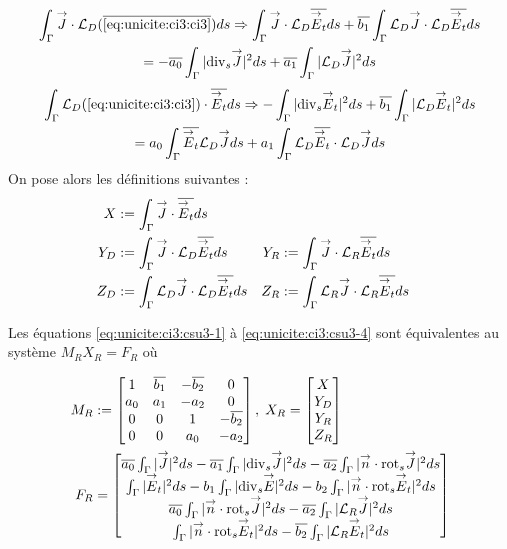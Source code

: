     \begin{multline}
    \label{eq:unicite:ci3:csu3-5}
    \int_\Gamma \vJ \cdot \LD ( \conj{\eqref{eq:unicite:ci3:ci3}} ) ds \Rightarrow
    \int_\Gamma \vJ \cdot \LD \conj{\vE_t} ds  + \conj{b_1} \int_\Gamma \LD \vJ \cdot \LD \conj{\vE_t} ds \\
    = - \conj{a_0} \int_\Gamma |\tdivs \vJ|^2ds + \conj{a_1} \int_\Gamma | \LD \vJ|^2 ds
  \end{multline}
  \begin{multline}
    \label{eq:unicite:ci3:csu3-6}
    \int_\Gamma  \LD ( \eqref{eq:unicite:ci3:ci3} ) \cdot \conj{\vE_t} ds \Rightarrow
    -\int_\Gamma | \tdivs \vE_t |^2 ds  + \conj{b_1} \int_\Gamma | \LD \vE_t|^2 ds \\
    = a_0 \int_\Gamma \conj{\vE_t} \LD \vJ ds + a_1 \int_\Gamma \LD \conj{\vE_t} \cdot \LD \vJ ds
  \end{multline}
  On pose alors les définitions suivantes :
  \begin{align*}
    X&:= \int_\Gamma {\overset{\rightarrow}{J}} \cdot {\overline{{\overset{\rightarrow}{E}}_t}} ds\\
    Y_D&:= \int_\Gamma {\overset{\rightarrow}{J}} \cdot {\mathcal{L}_D} {\overline{{\overset{\rightarrow}{E}}_t}} ds
    &Y_R&:= \int_\Gamma {\overset{\rightarrow}{J}} \cdot {\mathcal{L}_R} {\overline{{\overset{\rightarrow}{E}}_t}} ds\\
    Z_D&:= \int_\Gamma {\mathcal{L}_D} {\overset{\rightarrow}{J}} \cdot {\mathcal{L}_D} {\overline{{\overset{\rightarrow}{E}}_t}} ds
    &Z_R&:= \int_\Gamma {\mathcal{L}_R} {\overset{\rightarrow}{J}} \cdot {\mathcal{L}_R} {\overline{{\overset{\rightarrow}{E}}_t}} ds
  \end{align*}

  Les équations \eqref{eq:unicite:ci3:csu3-1} à \eqref{eq:unicite:ci3:csu3-4} sont équivalentes au système \(M_R X_R = F_R\) où

  \begin{align*}
    M_R&:=
    \begin{bmatrix}
      1&{\overline{b_1}}&-{\overline{b_2}}&0\\
      a_0&a_1&-a_2&0\\
      0&0&1&-{\overline{b_2}}\\
      0&0&a_0&-a_2\\
    \end{bmatrix},\;
    X_R =
    \begin{bmatrix}
      X\\
      Y_D\\
      Y_R\\
      Z_R
    \end{bmatrix}\\
    F_R &=
    \begin{bmatrix}
      {\overline{a_0}} \int_\Gamma |{\overset{\rightarrow}{J}}|^2ds - {\overline{a_1}} \int_\Gamma |{\operatorname{div}_s} {\overset{\rightarrow}{J}}|^2 ds - {\overline{a_2}} \int_\Gamma |{\overset{\rightarrow}{n}} \cdot {{\operatorname{rot}}_s} {\overset{\rightarrow}{J}}|^2 ds \\
      \int_\Gamma |{\overset{\rightarrow}{E}}_t|^2 ds  - b_1 \int_\Gamma | {\operatorname{div}_s} {\overset{\rightarrow}{E}} |^2 ds - b_2 \int_\Gamma | {\overset{\rightarrow}{n}} \cdot {{\operatorname{rot}}_s} {\overset{\rightarrow}{E}}_t|^2 ds \\
      {\overline{a_0}} \int_\Gamma |{\overset{\rightarrow}{n}} \cdot {{\operatorname{rot}}_s} {\overset{\rightarrow}{J}}|^2ds - {\overline{a_2}} \int_\Gamma | {\mathcal{L}_R} {\overset{\rightarrow}{J}}|^2 ds \\
      \int_\Gamma | {\overset{\rightarrow}{n}} \cdot {{\operatorname{rot}}_s} {\overset{\rightarrow}{E}}_t |^2 ds  - {\overline{b_2}} \int_\Gamma | {\mathcal{L}_R} {\overset{\rightarrow}{E}}_t|^2 ds
    \end{bmatrix}
  \end{align*}

